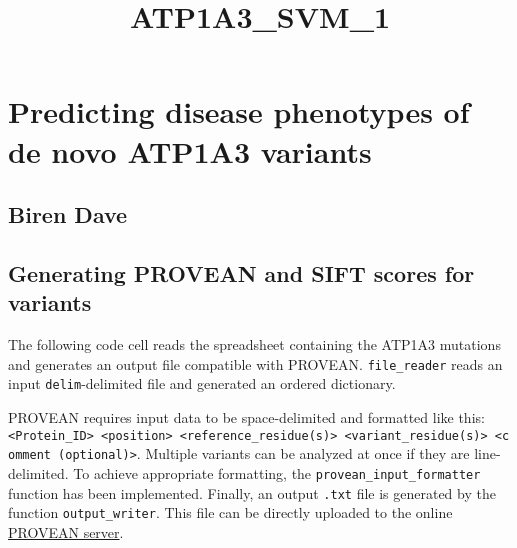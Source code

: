 \documentclass[11pt]{article}
\title{ATP1A3\_SVM\_1}
\begin{document}
    
    
    \maketitle
    
    

    
    \section{Predicting disease phenotypes of de novo ATP1A3
variants}\label{predicting-disease-phenotypes-of-de-novo-atp1a3-variants}

\subsection{Biren Dave}\label{biren-dave}

\subsection{Generating PROVEAN and SIFT scores for
variants}\label{generating-provean-and-sift-scores-for-variants}

The following code cell reads the spreadsheet containing the ATP1A3
mutations and generates an output file compatible with PROVEAN.
\texttt{file\_reader} reads an input \texttt{delim}-delimited file and
generated an ordered dictionary.

PROVEAN requires input data to be space-delimited and formatted like
this:
\texttt{\textless{}Protein\_ID\textgreater{}\ \textless{}position\textgreater{}\ \textless{}reference\_residue(s)\textgreater{}\ \textless{}variant\_residue(s)\textgreater{}\ \textless{}comment\ (optional)\textgreater{}}.
Multiple variants can be analyzed at once if they are line-delimited. To
achieve appropriate formatting, the \texttt{provean\_input\_formatter}
function has been implemented. Finally, an output \texttt{.txt} file is
generated by the function \texttt{output\_writer}. This file can be
directly uploaded to the online
\href{http://provean.jcvi.org/protein_batch_submit.php?species=human}{PROVEAN
server}.
\end{document}

